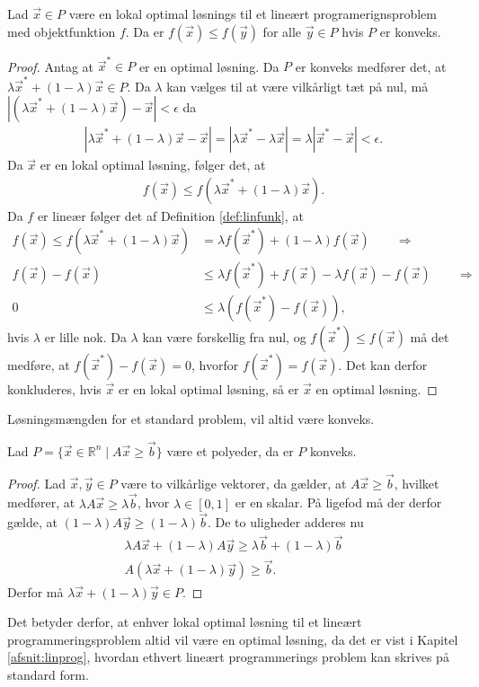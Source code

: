\begin{stn}
Lad $\vec{x} \in P$ være en lokal optimal løsnings til et lineært programerignsproblem  med objektfunktion $f$.
Da er  $f(\vec{x}) \leq f(\vec{y})$ for alle $\vec{y} \in P$ hvis $P$ er konveks.
\end{stn}
\begin{proof}
Antag at $\vec{x}^* \in P$ er en optimal løsning.
Da $P$ er konveks medfører det, at $\lambda \vec{x}^* + (1-\lambda)\vec{x} \in P$. 
Da $\lambda$ kan vælges til at være vilkårligt tæt på nul, må $|(\lambda \vec{x}^* + (1-\lambda)\vec{x}) - \vec{x}| < \epsilon$ da
\begin{align*}
 |\lambda \vec{x}^* + (1-\lambda)\vec{x} - \vec{x}| = | \lambda \vec{x}^* - \lambda\vec{x}| = \lambda|\vec{x}^* - \vec{x}| < \epsilon.
\end{align*}
Da $\vec{x}$ er en lokal optimal løsning, følger det, at
\begin{align*}
f(\vec{x}) \leq f(\lambda \vec{x}^* + (1-\lambda)\vec{x}).
\end{align*}
Da $f$ er lineær følger det af Definition \ref{def:linfunk}, at 
\begin{align*}
f(\vec{x}) \leq f(\lambda \vec{x}^* + (1-\lambda)\vec{x}) &= \lambda f(\vec{x}^*) + (1-\lambda)f(\vec{x}) \qquad \Rightarrow
\\ f(\vec{x}) - f(\vec{x}) &\leq \lambda f(\vec{x}^*) + f(\vec{x})-\lambda f(\vec{x}) - f(\vec{x}) \qquad \Rightarrow
\\ 0 & \leq \lambda( f(\vec{x}^*) - f(\vec{x})),
\end{align*}
hvis $\lambda$ er lille nok.
Da $ \lambda$ kan være forskellig fra nul, og $f(\vec{x}^*)\leq f(\vec{x})$ må det medføre, at $f(\vec{x}^*) - f(\vec{x}) = 0$, hvorfor $f(\vec{x}^*) =f(\vec{x})$. 
Det kan derfor konkluderes, hvis $\vec{x}$ er en lokal optimal løsning, så er $\vec{x}$ en optimal løsning.
\end{proof}
Løsningsmængden  for et standard problem, vil altid være konveks.
\begin{stn}
Lad $P =\{ \vec{x} \in \mathds{R}^n \mid A \vec{x} \geq \vec{b}\} $ være et polyeder, da er $P$ konveks.
\label{stn:polykon}
\end{stn}
\begin{proof}
Lad $\vec{x}, \vec{y} \in P$ være to vilkårlige vektorer, da gælder, at $A\vec{x} \geq \vec{b}$, hvilket medfører, at $\lambda A \vec{x} \geq \lambda\vec{b}$, hvor $\lambda \in [0,1]$ er en skalar. 
På ligefod må der derfor gælde, at $(1-\lambda)A\vec{y} \geq (1-\lambda)\vec{b}$.
De to uligheder adderes nu
\begin{align*}
\lambda A \vec{x} + (1-\lambda) A \vec{y} \geq \lambda \vec{b} + (1 - \lambda) \vec{b}
\\  A (\lambda\vec{x} + (1-\lambda)\vec{y}) \geq \vec{b}.
\end{align*}
Derfor må $\lambda\vec{x} + (1-\lambda)\vec{y} \in P$.
\end{proof}
Det betyder derfor, at enhver lokal optimal løsning til et lineært programmeringsproblem altid vil være en optimal løsning, da det er vist i Kapitel \ref{afsnit:linprog}, hvordan ethvert lineært programmerings problem kan skrives på standard form.

